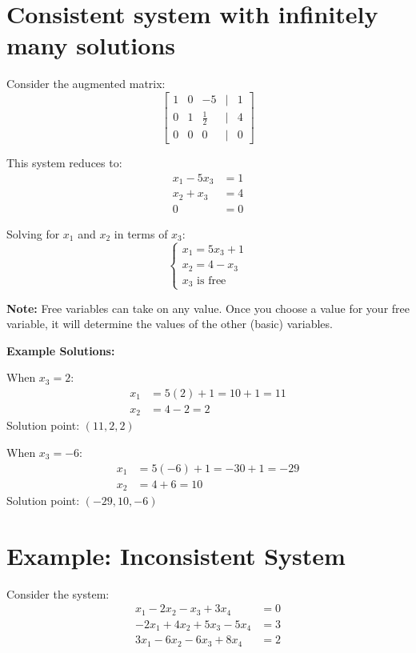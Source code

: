 \documentclass{article}
\begin{document}
\section*{Consistent system with infinitely many solutions}
\vspace{1em}

Consider the augmented matrix:
\[
\begin{bmatrix}
1 & 0 & -5 & | & 1 \\
0 & 1 & \frac{1}{2} & | & 4 \\
0 & 0 & 0 & | & 0
\end{bmatrix}
\]

This system reduces to:
\begin{align*}
x_1 - 5x_3 &= 1 \\
x_2 + x_3 &= 4 \\
0 &= 0
\end{align*}

Solving for $x_1$ and $x_2$ in terms of $x_3$:
\[
\begin{cases}
x_1 = 5x_3 + 1 \\
x_2 = 4 - x_3 \\
x_3 \text{ is free}
\end{cases}
\]

\textbf{Note:} Free variables can take on any value. Once you choose a value for your free variable, it will determine the values of the other (basic) variables.

\textbf{Example Solutions:}

When $x_3 = 2$:
\begin{align*}
x_1 &= 5(2) + 1 = 10 + 1 = 11 \\
x_2 &= 4 - 2 = 2
\end{align*}
Solution point: $(11, 2, 2)$

When $x_3 = -6$:
\begin{align*}
x_1 &= 5(-6) + 1 = -30 + 1 = -29 \\
x_2 &= 4 + 6 = 10
\end{align*}
Solution point: $(-29, 10, -6)$

\section*{Example: Inconsistent System}
Consider the system:
\begin{align*}
x_1 - 2x_2 - x_3 + 3x_4 &= 0 \\
-2x_1 + 4x_2 + 5x_3 - 5x_4 &= 3 \\
3x_1 - 6x_2 - 6x_3 + 8x_4 &= 2
\end{align*}
\end{document}
